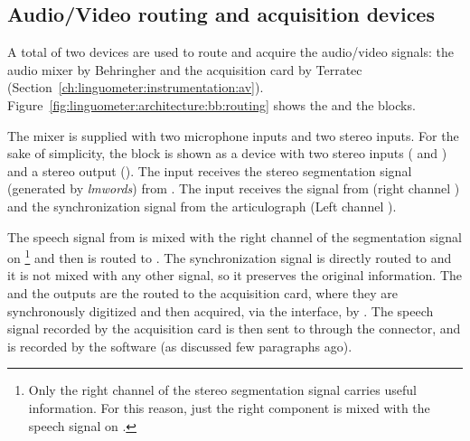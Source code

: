 \subsection{Audio/Video routing and acquisition devices}

A total of two devices are used to route and acquire the audio/video signals:
the  audio mixer by Behringher and the  acquisition card by
Terratec (Section~\ref{ch:linguometer:instrumentation:av}).
Figure~\ref{fig:linguometer:architecture:bb:routing} shows the  and the
 blocks.

The  mixer is supplied with two microphone inputs and two stereo
inputs.
For the sake of simplicity,  the  block is shown as a device with 
two stereo inputs ( and ) and a stereo output
().
The  input receives the stereo segmentation signal (generated by 
\emph{lmwords}) from .
The  input receives the  signal from  (right
channel ) and the synchronization signal  from 
the  articulograph (Left channel ).

The speech signal from  is mixed with the right channel of
the segmentation signal on \footnote{Only the right channel of
the stereo segmentation signal carries useful information. For this reason,
just the right component is mixed with the speech signal on .} 
and then is routed to . 
The synchronization signal  is directly routed to 
and it is not mixed with any other signal, so it preserves the original
information.
The  and the  outputs are the routed to the
 acquisition card, where they are synchronously digitized and then
acquired, via the  interface, by .
The speech signal recorded by the acquisition card is then sent to 
through the  connector, and is recorded by the 
software (as discussed few paragraphs ago).
